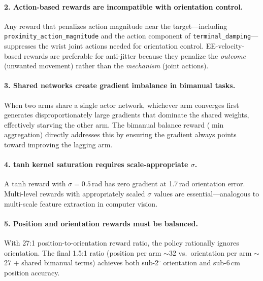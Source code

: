 \documentclass[11pt,a4paper]{article}
\begin{document}
\paragraph{2. Action-based rewards are incompatible with orientation control.}
Any reward that penalizes action magnitude near the target---including \texttt{proximity\_action\_magnitude} and the action component of \texttt{terminal\_damping}---suppresses the wrist joint actions needed for orientation control. EE-velocity-based rewards are preferable for anti-jitter because they penalize the \emph{outcome} (unwanted movement) rather than the \emph{mechanism} (joint actions).

\paragraph{3. Shared networks create gradient imbalance in bimanual tasks.}
When two arms share a single actor network, whichever arm converges first generates disproportionately large gradients that dominate the shared weights, effectively starving the other arm. The bimanual balance reward ($\min$ aggregation) directly addresses this by ensuring the gradient always points toward improving the lagging arm.

\paragraph{4. tanh kernel saturation requires scale-appropriate $\sigma$.}
A tanh reward with $\sigma=0.5$\,rad has zero gradient at 1.7\,rad orientation error. Multi-level rewards with appropriately scaled $\sigma$ values are essential---analogous to multi-scale feature extraction in computer vision.

\paragraph{5. Position and orientation rewards must be balanced.}
With 27:1 position-to-orientation reward ratio, the policy rationally ignores orientation. The final 1.5:1 ratio (position per arm $\sim$32 vs.\ orientation per arm $\sim$27 + shared bimanual terms) achieves both sub-2$^\circ$ orientation and sub-6\,cm position accuracy.
\end{document}
